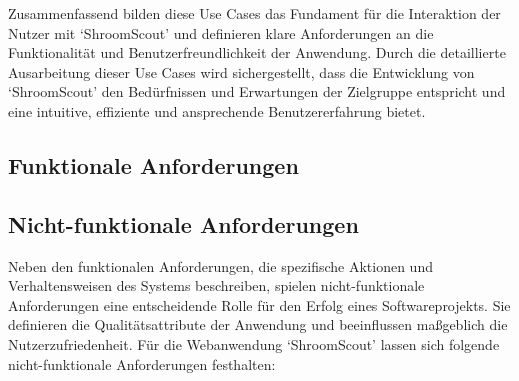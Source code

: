 \documentclass[../main.tex]{subfiles} %
\begin{document}
Zusammenfassend bilden diese Use Cases das Fundament für die Interaktion der Nutzer mit `ShroomScout' und definieren klare
Anforderungen an die Funktionalität und Benutzerfreundlichkeit der Anwendung. Durch die detaillierte Ausarbeitung dieser Use
Cases wird sichergestellt, dass die Entwicklung von `ShroomScout' den Bedürfnissen und Erwartungen der Zielgruppe entspricht
und eine intuitive, effiziente und ansprechende Benutzererfahrung bietet.

\subsection{Funktionale Anforderungen} %

\subsection{Nicht-funktionale Anforderungen} %

Neben den funktionalen Anforderungen, die spezifische Aktionen und Verhaltensweisen des Systems beschreiben, spielen
nicht-funktionale Anforderungen eine entscheidende Rolle für den Erfolg eines Softwareprojekts. Sie definieren die
Qualitätsattribute der Anwendung und beeinflussen maßgeblich die Nutzerzufriedenheit. Für die Webanwendung `ShroomScout'
lassen sich folgende nicht-funktionale Anforderungen festhalten:
\end{document}
